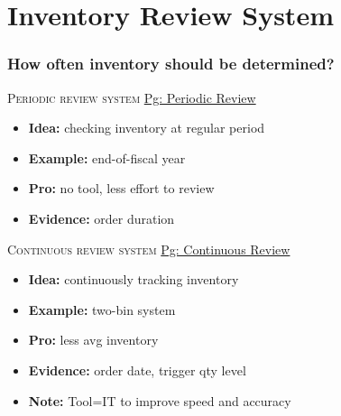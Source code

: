 \documentclass[10pt,handout,notes=show]{beamer}
\begin{document}
\section[Review System]{Inventory Review System}
  \begin{frame}
  \frametitle{How often inventory should be determined?}

  \textsc{Periodic review system} \hfill \hyperlink{periodic}{Pg: Periodic Review}
  \begin{itemize}
    \item \textbf{Idea:} \alert{checking inventory} at regular period
    \item \textbf{Example:} end-of-fiscal year
    \item \textbf{Pro:} no tool, less effort to review
    \item \textbf{Evidence:} order duration
  \end{itemize}

  \NextLine
  \textsc{Continuous review system}  \hfill \hyperlink{cont}{Pg: Continuous Review}
  \begin{itemize}
    \item \textbf{Idea:} continuously \alert{tracking inventory}
    \item \textbf{Example:} two-bin system
    \item \textbf{Pro:} less avg inventory
    \item \textbf{Evidence:} order date, trigger qty level
    \item \textbf{Note:} Tool=IT to improve speed and \alert{accuracy}
  \end{itemize}


\end{frame}
\end{document}
